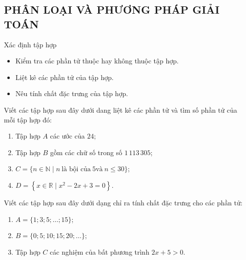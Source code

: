 \subsection{PHÂN LOẠI VÀ PHƯƠNG PHÁP GIẢI TOÁN}
\begin{dang}{Xác định tập hợp}
	\begin{itemize}
		\item Kiểm tra các phần tử thuộc hay không thuộc tập hợp.
		\item Liệt kê các phần tử của tập hợp.
		\item Nêu tính chất đặc trưng của tập hợp.
	\end{itemize}
\end{dang}
\begin{vd}%
	Viết các tập hợp sau đây dưới dang liệt kê các phần tử và tìm số phần tử của mỗi tập hợp đó:
	\begin{enumerate}
		\item Tập hợp $A$ các ước của $24$\dotfill;
		\item Tập hợp $B$ gồm các chữ số trong số $1\,113\,305$\dotfill;
		\item $C=\{n \in \mathbb{N} \mid n~ \text{là bội của}~ 5 \text{và}~ n \leq 30\}$\dotfill;
		\item $D=\left\{x \in \mathbb{R} \mid x^2-2x+3=0\right\}$\dotfill.
	\end{enumerate}
\end{vd}
\begin{vd}%
	Viết các tập hợp sau đây dưới dạng chỉ ra tính chất đặc trưng cho các phần tử:
	\begin{enumerate}
		\item $A=\{1; 3; 5; \ldots; 15\}$\dotfill;
		\item $B=\{0; 5; 10; 15; 20; \ldots\}$\dotfill;
		\item Tập hợp $C$ các nghiệm của bất phương trình $2x+5> 0$.
	\end{enumerate}
\end{vd}
